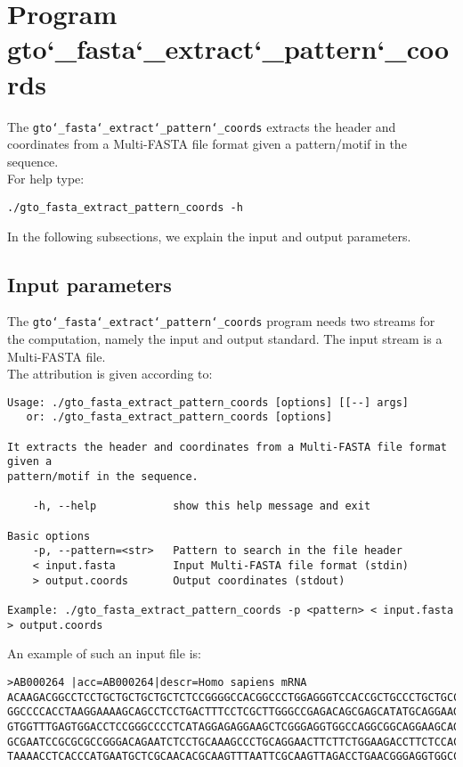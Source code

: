 \section{Program gto\char`_fasta\char`_extract\char`_pattern\char`_coords}
The \texttt{gto\char`_fasta\char`_extract\char`_pattern\char`_coords} extracts the header and coordinates from a Multi-FASTA file format given a pattern/motif in the sequence. \\
For help type:
\begin{lstlisting}
./gto_fasta_extract_pattern_coords -h
\end{lstlisting}
In the following subsections, we explain the input and output parameters.

\subsection*{Input parameters}

The \texttt{gto\char`_fasta\char`_extract\char`_pattern\char`_coords} program needs two streams for the computation, namely the input and output standard. The input stream is a Multi-FASTA  file.\\
The attribution is given according to:
\begin{lstlisting}
Usage: ./gto_fasta_extract_pattern_coords [options] [[--] args]
   or: ./gto_fasta_extract_pattern_coords [options]

It extracts the header and coordinates from a Multi-FASTA file format given a 
pattern/motif in the sequence.

    -h, --help            show this help message and exit

Basic options
    -p, --pattern=<str>   Pattern to search in the file header
    < input.fasta         Input Multi-FASTA file format (stdin)
    > output.coords       Output coordinates (stdout)

Example: ./gto_fasta_extract_pattern_coords -p <pattern> < input.fasta > output.coords
\end{lstlisting}
An example of such an input file is:
\begin{lstlisting}
>AB000264 |acc=AB000264|descr=Homo sapiens mRNA 
ACAAGACGGCCTCCTGCTGCTGCTGCTCTCCGGGGCCACGGCCCTGGAGGGTCCACCGCTGCCCTGCTGCCATTGTCCCC
GGCCCCACCTAAGGAAAAGCAGCCTCCTGACTTTCCTCGCTTGGGCCGAGACAGCGAGCATATGCAGGAAGCGGCAGGAA
GTGGTTTGAGTGGACCTCCGGGCCCCTCATAGGAGAGGAAGCTCGGGAGGTGGCCAGGCGGCAGGAAGCAGGCCAGTGCC
GCGAATCCGCGCGCCGGGACAGAATCTCCTGCAAAGCCCTGCAGGAACTTCTTCTGGAAGACCTTCTCCACCCCCCCAGC
TAAAACCTCACCCATGAATGCTCGCAACACGCAAGTTTAATTCGCAAGTTAGACCTGAACGGGAGGTGGCCACGCAAGTT
\end{lstlisting}

